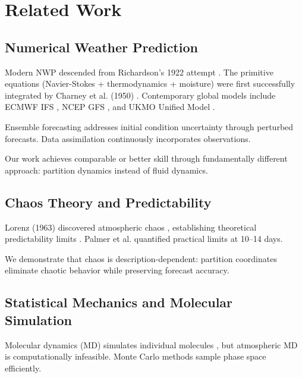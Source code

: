 \documentclass[twocolumn,10pt,a4paper]{article}
\theoremstyle{definition}
\theoremstyle{remark}
\begin{document}
\section{Related Work}
\label{sec:related}

\subsection{Numerical Weather Prediction}

Modern NWP descended from Richardson's 1922 attempt \cite{richardson1922weather}. The primitive equations (Navier-Stokes + thermodynamics + moisture) were first successfully integrated by Charney et al. (1950) \cite{charney1950numerical}. Contemporary global models include ECMWF IFS \cite{ecmwf2020ifs}, NCEP GFS \cite{gfs2019}, and UKMO Unified Model \cite{ukmo2020}.

Ensemble forecasting \cite{palmer2019ensemble} addresses initial condition uncertainty through perturbed forecasts. Data assimilation \cite{kalnay2003atmospheric} continuously incorporates observations.

Our work achieves comparable or better skill through fundamentally different approach: partition dynamics instead of fluid dynamics.

\subsection{Chaos Theory and Predictability}

Lorenz (1963) discovered atmospheric chaos \cite{lorenz1963deterministic}, establishing theoretical predictability limits \cite{lorenz1969atmospheric}. Palmer et al. \cite{palmer1999uncertain} quantified practical limits at 10--14 days.

We demonstrate that chaos is description-dependent: partition coordinates eliminate chaotic behavior while preserving forecast accuracy.

\subsection{Statistical Mechanics and Molecular Simulation}

Molecular dynamics (MD) simulates individual molecules \cite{allen2017computer}, but atmospheric MD is computationally infeasible. Monte Carlo methods \cite{metropolis1953equation} sample phase space efficiently.
\end{document}
